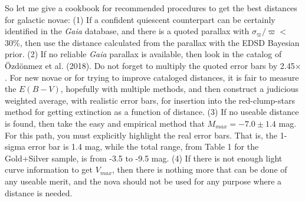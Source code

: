 \documentclass[a4paper,fleqn,usenatbib]{mnras}
\begin{document}
So let me give a cookbook for recommended procedures to get the best distances for galactic novae:  (1) If a confident quiescent counterpart can be certainly identified in the {\it Gaia} database, and there is a quoted parallax with $\sigma_{\varpi}/\varpi <$30\%, then use the distance calculated from the parallax with the EDSD Bayesian prior.  (2) If no reliable {\it Gaia} parallax is available, then look in the catalog of \"{O}zd\"{o}nmez et al. (2018).  Do not forget to multiply the quoted error bars by 2.45$\times$.  For new novae or for trying to improve cataloged distances, it is fair to measure the $E(B-V)$, hopefully with multiple methods, and then construct a judicious weighted average, with realistic error bars, for insertion into the red-clump-stars method for getting extinction as a function of distance.  (3) If no useable distance is found, then take the easy and empirical method that $M_{max}=-7.0\pm1.4$ mag.  For this path, you must explicitly highlight the real error bars.  That is, the 1-sigma error bar is 1.4 mag, while the total range, from Table 1 for the Gold+Silver sample, is from -3.5 to -9.5 mag.  (4) If there is not enough light curve information to get $V_{max}$, then there is nothing more that can be done of any useable merit, and the nova should not be used for any purpose where a distance is needed.


\end{document}
